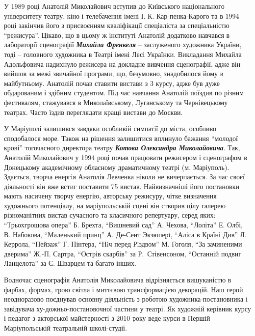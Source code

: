 
У 1989 році Анатолій Миколайович вступив до Київського національного
університету театру, кіно і телебачення імені І. К. Кар\hyp{}пенка-Карого та в 1994
році закінчив його з присвоєнням кваліфікації спеціаліста за спеціальністю
\enquote{режисура}. Цікаво, що в цьому ж інституті Анатолій додатково навчався в
лабораторії сценографії \textbf{\emph{Михайла Френкеля}} – заслуженого художника України, тоді
– головного художника в Театрі імені Лесі Українки. Викладання Михайла
Адольфовича надихнуло режисера на докладне вивчення сценографії, адже він
вийшов за межі звичайної програми, що, безумовно, знадобилося йому в
майбутньому. Анатолій почав ставити вистави з 3 курсу, адже був дуже
обдарованим і здібним студентом. Під час навчання Анатолій поїздив по різним
фестивалям, стажувався в Миколаївському, Луганському та Чернівецькому театрах.
Часто їздив переглядати кращі вистави до Москви.


У Маріуполі залишився завдяки особливій симпатії до міста, особливо сподобалося
море. Також на рішення залишитися вплинуло бажання \enquote{молодої крові} тогочасного
директора театру \emph{\textbf{Котова Олександра Миколайовича}}. Так, Анатолій Миколайович у
1994 році почав працювати режисером і сценографом в Донецькому академічному
обласному драматичному театрі (м. Маріуполь). Здається, творча енергія Анатолія
Левченка ніколи не вичерпається. За час своєї діяльності він вже встиг
поставити 75 вистав. Найвизначніші його постановки мають насичену творчу
енергію, авторську режисуру, чітке визначення художнього потенціалу, на
маріупольській сцені він створив цілу галерею різноманітних вистав сучасного та
класичного репертуару, серед яких: \enquote{Трьохгрошова опера} Б. Брехта, \enquote{Вишневий
сад} А. Чехова, \enquote{Лоліта} Е. Олбі, В. Набокова, \enquote{Маленький принц} А. Де-Сент
Экзюперi, \enquote{Аліса в Країні Див} Л. Керрола, \enquote{Пейзаж} Г. Пінтера, \enquote{Нiч перед
Рiздвом} М. Гоголя, \enquote{За зачиненими дверима} Ж.-П. Сартра, \enquote{Острів скарбів} за
Р.\ Стівенсоном, \enquote{Останній подвиг Ланцелота} за Є. Шварцем та багато інших.


Водночас сценографія Анатолія Миколайовича відрізняється вишуканістю в фарбах,
формах, грою світла і миттєвою трансформацією декорацій. Наш герой неодноразово
поєднував основну діяльність з роботою художника-постановника і завідувача
ху\hyp{}дожньо-постановочної частини у театрі. Як художній керівник курсу і педагог з
акторської майстерності з 2010 року веде курси в Першій Маріупольській
театральній школі-студії.

